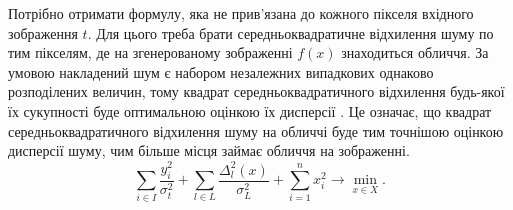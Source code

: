 Потрібно отримати формулу,
яка не прив'язана до кожного пікселя вхідного зображення $t$.
Для цього треба брати середньоквадратичне відхилення шуму по тим пікселям,
де на згенерованому зображенні $f\left( x \right)$ знаходиться обличчя.
За умовою накладений шум є
набором незалежних випадкових однаково розподілених величин,
тому квадрат середньоквадратичного відхилення будь-якої їх сукупності
буде оптимальною оцінкою їх дисперсії \cite{BorovkovMS}.
Це означає, що квадрат середньоквадратичного відхилення шуму
на обличчі буде тим точнішою оцінкою дисперсії шуму,
чим більше місця займає обличчя на зображенні.
\begin{equation}\label{eq:energy:common}
  \sum_{i \in I} \frac{y_i^2}{\sigma^2_t}
  + \sum_{l \in L} \frac{\Delta_l^2\left( x \right)}{\sigma_L^2}
  + \sum_{i = 1}^n x_i^2
  \to \min\limits_{x \in X}.
\end{equation}

